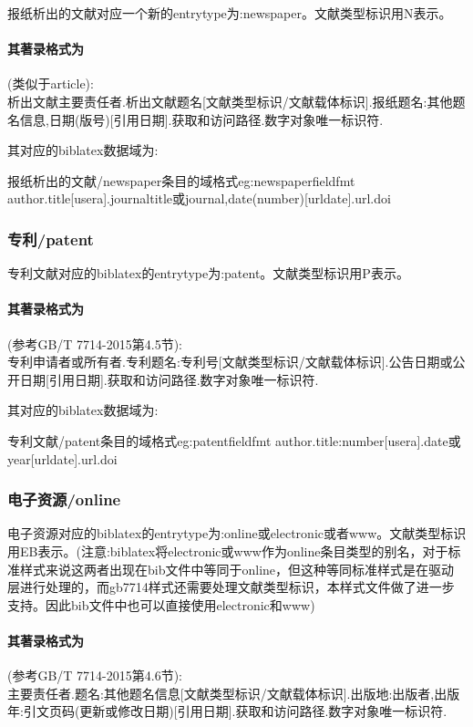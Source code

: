 \begin{refentry}{}{}
报纸析出的文献对应一个新的entrytype为:newspaper。文献类型标识用N表示。

\paragraph{其著录格式为}(类似于article):\\
析出文献主要责任者.析出文献题名[文献类型标识/文献载体标识].报纸题名:其他题名信息,日期(版号)[引用日期].获取和访问路径.数字对象唯一标识符.
\end{refentry}

其对应的biblatex数据域为:
\begin{codetex}{报纸析出的文献/newspaper条目的域格式}{eg:newspaperfieldfmt}
author.title[usera].journaltitle或journal,date(number)[urldate].url.doi
\end{codetex}

\subsubsection{专利/patent}
\begin{refentry}{}{}
专利文献对应的biblatex的entrytype为:patent。文献类型标识用P表示。

\paragraph{其著录格式为}(参考GB/T 7714-2015第4.5节):\\
专利申请者或所有者.专利题名:专利号[文献类型标识/文献载体标识].公告日期或公开日期[引用日期].获取和访问路径.数字对象唯一标识符.
\end{refentry}

其对应的biblatex数据域为:
\begin{codetex}{专利文献/patent条目的域格式}{eg:patentfieldfmt}
author.title:number[usera].date或year[urldate].url.doi
\end{codetex}

\subsubsection{电子资源/online}
\begin{refentry}{}{}
电子资源对应的biblatex的entrytype为:online或electronic或者www。文献类型标识用EB表示。(注意:biblatex将electronic或www作为online条目类型的别名，对于标准样式来说这两者出现在bib文件中等同于online，但这种等同标准样式是在驱动层进行处理的，而gb7714样式还需要处理文献类型标识，本样式文件做了进一步支持。因此bib文件中也可以直接使用electronic和www)

\paragraph{其著录格式为}(参考GB/T 7714-2015第4.6节):\\
主要责任者.题名:其他题名信息[文献类型标识/文献载体标识].出版地:出版者,出版年:引文页码(更新或修改日期)[引用日期].获取和访问路径.数字对象唯一标识符.
\end{refentry}

